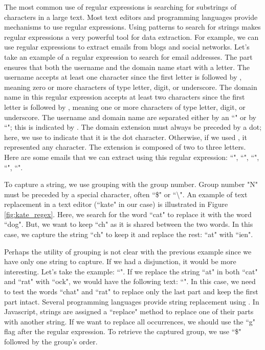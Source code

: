 \documentclass{KBook}
\begin{document}
The most common use of regular expressions is searching for substrings of characters in a large text.
Most text editors and programming languages provide mechanisms to use regular expressions.
Using patterns to search for strings makes regular expressions a very powerful tool for data extraction.
For example, we can use regular expressions to extract emails from blogs and social networks.
Let's take an example of a regular expression  to search for email addresses.
The part \expword{/[a-zA-Z]/} ensures that both the username and the domain name start with a letter.
The username accepts at least one character since the first letter is followed by , meaning zero or more characters of type letter, digit, or underscore.
The domain name in this regular expression accepts at least two characters since the first letter is followed by , meaning one or more characters of type letter, digit, or underscore.
The username and domain name are separated either by an ``" or by ``"; this is indicated by .
The domain extension must always be preceded by a dot; here, we use  to indicate that it is the dot character.
Otherwise, if we used , it represented any character.
The extension is composed of two to three letters.
Here are some emails that we can extract using this regular expression: 
``", ``", ``", ``", ``".

To capture a string, we use grouping with the group number.
Group number "N" must be preceded by a special character, often ``\$" or ``\textbackslash".
An example of text replacement in a text editor (``kate" in our case) is illustrated in Figure \ref{fig:kate_regex}.
Here, we search for the word ``cat" to replace it with the word ``dog". 
But, we want to keep ``ch" as it is shared between the two words.
In this case, we capture the string ``ch" to keep it and replace the rest: ``at" with ``ien".


Perhaps the utility of grouping is not clear with the previous example since we have only one string to capture.
If we had a disjunction, it would be more interesting.
Let's take the example: ``".
If we replace the string ``at" in both ``cat" and ``rat" with ``ock", we would have the following text:
``".
In this case, we need to test the words ``chat" and ``rat" to replace only the last part and keep the first part intact.
Several programming languages provide string replacement using .
In Javascript, strings are assigned a ``replace" method to replace one of their parts with another string.
If we want to replace all occurrences, we should use the ``g" flag after the regular expression.
To retrieve the captured group, we use ``\$" followed by the group's order.
\end{document}
